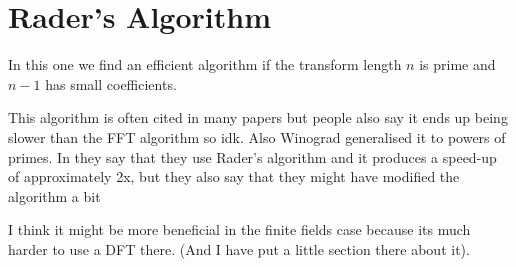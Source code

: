 \section{Rader's Algorithm}%
\label{sec:Rader's Algorithm}

In this one we find an efficient algorithm if the transform length $n$ is prime and $n - 1$ has small coefficients.

This algorithm is often cited in many papers but people also say it ends up being slower than the FFT algorithm so idk. Also Winograd generalised it to powers of primes. In  they say that they use Rader's algorithm and it produces a speed-up of approximately 2x, but they also say that they might have modified the algorithm a bit

I think it might be more beneficial in the finite fields case because its much harder to use a DFT there. (And I have put a little section there about it).

